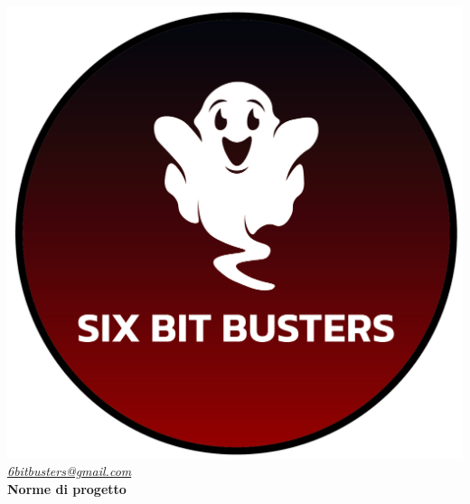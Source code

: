 \thispagestyle{empty}
\renewcommand{\arraystretch}{1.3}


\begin{titlepage}
	\begin{center}
		
	\includegraphics[scale = 0.7]{template/images/logo-circle.png}
	\\[1cm]
	\href{mailto:6bitbusters@gmail.com}		      	
	{\large{\textit{6bitbusters@gmail.com} } }\\[1cm]
	
	\Huge \textbf{Norme di progetto} \\[1cm]


\end{center}
\end{titlepage}
